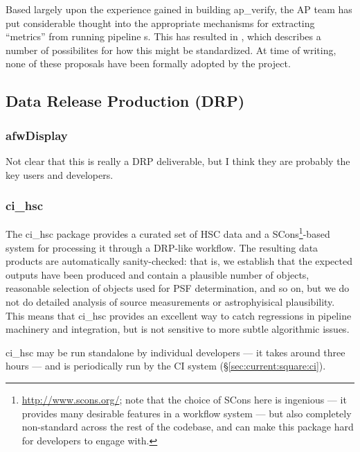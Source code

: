 \documentclass[DM,authoryear,toc,lsstdraft]{lsstdoc}
\begin{document}
Based largely upon the experience gained in building ap\_verify, the AP team
has put considerable thought into the appropriate mechanisms for extracting
``metrics'' from running pipeline s. This has resulted in
, which describes a number of possibilites for how this might
be standardized. At time of writing, none of these proposals have been
formally adopted by the project.

\subsection{Data Release Production (DRP)}
\label{sec:current:drp}

\subsubsection{afwDisplay}
\label{sec:current:drp:afwDisplay}

\begin{draftnote}
Not clear that this is really a DRP deliverable, but I think they are probably
the key users and developers.
\end{draftnote}

\subsubsection{ci\_hsc}
\label{sec:current:drp:cihsc}

The ci\_hsc package provides a curated set of HSC data and a
SCons\footnote{\url{http://www.scons.org/}; note that the choice of SCons here
is ingenious --- it provides many desirable features in a workflow system ---
but also completely non-standard across the rest of the codebase, and can make
this package hard for developers to engage with.}-based system for processing
it through a DRP-like workflow. The resulting data products are automatically
sanity-checked: that is, we establish that the expected outputs have been
produced and contain a plausible number of objects, reasonable selection of
objects used for PSF determination, and so on, but we do not do detailed
analysis of source measurements or astrophyisical plausibility. This means
that ci\_hsc provides an excellent way to catch regressions in pipeline
machinery and integration, but is not sensitive to more subtle algorithmic
issues.

ci\_hsc may be run standalone by individual developers --- it takes around
three hours --- and is periodically run by the CI system
(\S\ref{sec:current:square:ci}).
\end{document}
